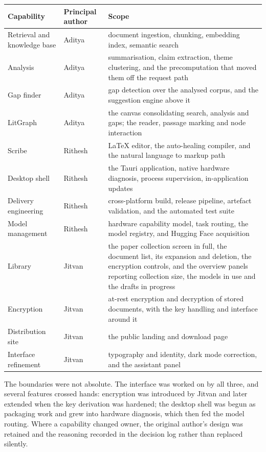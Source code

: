 \documentclass[11pt,a4paper]{article}
\begin{document}
\begin{center}
\small
\begin{tabularx}{\linewidth}{@{}llX@{}}
\toprule
\textbf{Capability} & \textbf{Principal author} & \textbf{Scope} \\
\midrule
Retrieval and knowledge base & Aditya & document ingestion, chunking, embedding
index, semantic search \\
Analysis & Aditya & summarisation, claim extraction, theme clustering, and the
precomputation that moved them off the request path \\
Gap finder & Aditya & gap detection over the analysed corpus, and the
suggestion engine above it \\
LitGraph & Aditya & the canvas consolidating search, analysis and gaps; the
reader, passage marking and node interaction \\
\midrule
Scribe & Rithesh & LaTeX editor, the auto-healing compiler, and the natural
language to markup path \\
Desktop shell & Rithesh & the Tauri application, native hardware diagnosis,
process supervision, in-application updates \\
Delivery engineering & Rithesh & cross-platform build, release pipeline,
artefact validation, and the automated test suite \\
Model management & Rithesh & hardware capability model, task routing, the
model registry, and Hugging Face acquisition \\
\midrule
Library & Jitvan & the paper collection screen in full, the document list,
its expansion and deletion, the encryption controls, and the overview panels
reporting collection size, the models in use and the drafts in progress \\
Encryption & Jitvan & at-rest encryption and decryption of stored documents,
with the key handling and interface around it \\
Distribution site & Jitvan & the public landing and download page \\
Interface refinement & Jitvan & typography and identity, dark mode correction,
and the assistant panel \\
\bottomrule
\end{tabularx}
\end{center}

The boundaries were not absolute. The interface was worked on by all three, and
several features crossed hands: encryption was introduced by Jitvan and later
extended when the key derivation was hardened; the desktop shell was begun as
packaging work and grew into hardware diagnosis, which then fed the model
routing. Where a capability changed owner, the original author's design was
retained and the reasoning recorded in the decision log rather than replaced
silently.
\end{document}
